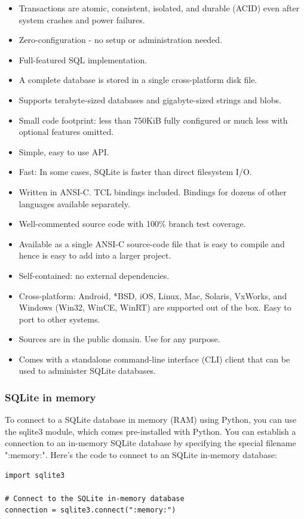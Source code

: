\begin{itemize}[label=--]
    \item Transactions are atomic, consistent, isolated, and durable (ACID) even after system crashes and power failures.
    \item Zero-configuration - no setup or administration needed.
    \item Full-featured SQL implementation.
    \item A complete database is stored in a single cross-platform disk file.
    \item Supports terabyte-sized databases and gigabyte-sized strings and blobs.
    \item Small code footprint: less than 750KiB fully configured or much less with optional features omitted.
    \item Simple, easy to use API.
    \item Fast: In some cases, SQLite is faster than direct filesystem I/O.
    \item Written in ANSI-C. TCL bindings included. Bindings for dozens of other languages available separately.
    \item Well-commented source code with 100\% branch test coverage.
    \item Available as a single ANSI-C source-code file that is easy to compile and hence is easy to add into a larger project.
    \item Self-contained: no external dependencies.
    \item Cross-platform: Android, *BSD, iOS, Linux, Mac, Solaris, VxWorks, and Windows (Win32, WinCE, WinRT) are supported out of the box. Easy to port to other systems.
    \item Sources are in the public domain. Use for any purpose.
    \item Comes with a standalone command-line interface (CLI) client that can be used to administer SQLite databases.
\end{itemize}

\newpage
\subsubsection{SQLite in memory}
To connect to a SQLite database in memory (RAM) using Python, you can use the sqlite3 module, which comes pre-installed with Python. You can establish a connection to an in-memory SQLite database by specifying the special filename ":memory:". Here's the code to connect to an SQLite in-memory database:
\begin{codebox}
\begin{verbatim}
import sqlite3

# Connect to the SQLite in-memory database
connection = sqlite3.connect(":memory:")
\end{verbatim}
\end{codebox}

